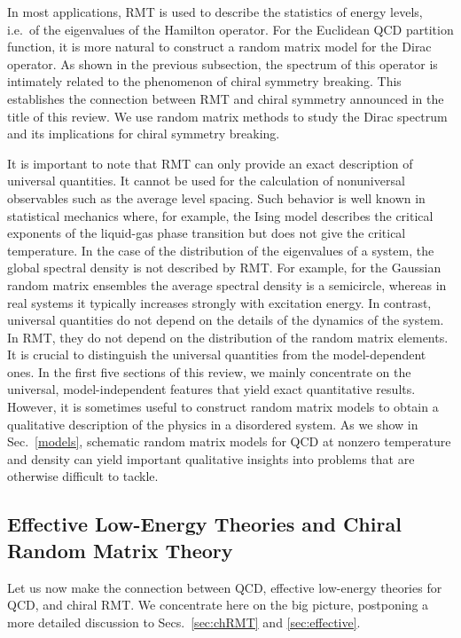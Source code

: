 In most applications, RMT is used to describe the statistics of energy
levels, i.e.\ of the eigenvalues of the Hamilton operator.  For the
Euclidean QCD partition function, it is more natural to construct a
random matrix model for the Dirac operator.  As shown in the
previous subsection, the spectrum of this operator is intimately
related to the phenomenon of chiral symmetry breaking.  This
establishes the connection between RMT and chiral symmetry announced
in the title of this review.  We use random matrix methods to
study the Dirac spectrum and its implications for chiral symmetry
breaking.

It is important to note that RMT
can only provide an exact description of universal
quantities. It cannot be used for the calculation of nonuniversal
observables such as the average level spacing. Such behavior is
well known in statistical mechanics where, for example, the Ising
model describes the critical exponents of the liquid-gas phase
transition but does not give the critical temperature.  In the case
of the distribution of the eigenvalues of a system, the global
spectral density is not described by RMT.  For
example, for the Gaussian random matrix ensembles the average spectral
density is a semicircle, whereas in real systems it typically increases
strongly with excitation energy.  In contrast, universal quantities do
not depend on the details of the dynamics of the system.  In RMT, they
do not depend on the distribution of the random matrix elements. 
It is crucial to
distinguish the universal quantities from the model-dependent ones.
In the first five sections of this review, we mainly concentrate
on the universal, model-independent features that yield exact
quantitative results.  However, it is sometimes useful to construct
random matrix models to obtain a qualitative description of the
physics in a disordered system.  As we show in Sec.~\ref{models},
schematic random matrix models for QCD at nonzero temperature and
density can yield important qualitative insights into problems that
are otherwise difficult to tackle.



\subsection{Effective Low-Energy Theories and Chiral Random Matrix Theory}
\label{sec1.3}

Let us now make the connection between QCD, effective low-energy
theories for QCD, and chiral RMT.  We concentrate here on the big
picture, postponing a more detailed discussion to
Secs.~\ref{sec:chRMT} and \ref{sec:effective}.

